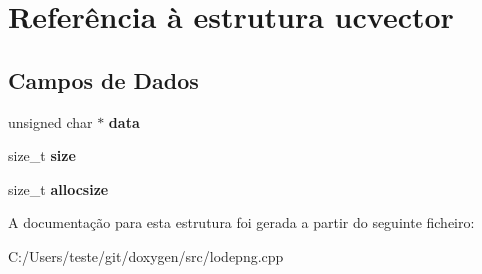\hypertarget{structucvector}{\section{Referência à estrutura ucvector}
\label{structucvector}
}
\subsection*{Campos de Dados}
\begin{DoxyCompactItemize}
\item 
\hypertarget{structucvector_ac24cea2bfcc927fd29bc74d1086707d8}{unsigned char $\ast$ {\bfseries data}}\label{structucvector_ac24cea2bfcc927fd29bc74d1086707d8}

\item 
\hypertarget{structucvector_a854352f53b148adc24983a58a1866d66}{size\-\_\-t {\bfseries size}}\label{structucvector_a854352f53b148adc24983a58a1866d66}

\item 
\hypertarget{structucvector_a5a20ebbe2e7f1b4cdaafb193b7a4a6a0}{size\-\_\-t {\bfseries allocsize}}\label{structucvector_a5a20ebbe2e7f1b4cdaafb193b7a4a6a0}

\end{DoxyCompactItemize}


A documentação para esta estrutura foi gerada a partir do seguinte ficheiro\-:\begin{DoxyCompactItemize}
\item 
C\-:/\-Users/teste/git/doxygen/src/lodepng.\-cpp\end{DoxyCompactItemize}
